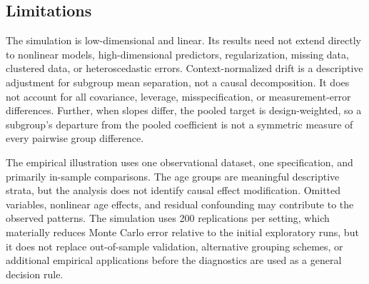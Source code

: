 \subsection{Limitations}\label{sec:limitations}

The simulation is low-dimensional and linear. Its results need not extend directly to nonlinear models, high-dimensional predictors, regularization, missing data, clustered data, or heteroscedastic errors. Context-normalized drift is a descriptive adjustment for subgroup mean separation, not a causal decomposition. It does not account for all covariance, leverage, misspecification, or measurement-error differences. Further, when slopes differ, the pooled target is design-weighted, so a subgroup's departure from the pooled coefficient is not a symmetric measure of every pairwise group difference.

The empirical illustration uses one observational dataset, one specification, and primarily in-sample comparisons. The age groups are meaningful descriptive strata, but the analysis does not identify causal effect modification. Omitted variables, nonlinear age effects, and residual confounding may contribute to the observed patterns. The simulation uses 200 replications per setting, which materially reduces Monte Carlo error relative to the initial exploratory runs, but it does not replace out-of-sample validation, alternative grouping schemes, or additional empirical applications before the diagnostics are used as a general decision rule.